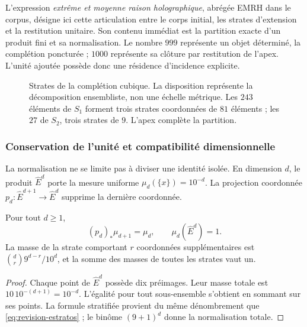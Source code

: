 L'expression \emph{extrême et moyenne raison holographique}, abrégée EMRH dans
le corpus, désigne ici cette articulation entre le corps initial, les
strates d'extension et la restitution unitaire. Son contenu immédiat
est la partition exacte d'un produit fini et sa normalisation. Le nombre
\(999\) représente un objet déterminé, la complétion poncturée ;
\(1000\) représente sa clôture par restitution de l'apex. L'unité
ajoutée possède donc une résidence d'incidence explicite.

\begin{figure}[htbp]
\centering
{}
\caption{Strates de la complétion cubique. La disposition représente
la décomposition ensembliste, non une échelle métrique. Les \(243\) éléments
de \(S_1\) forment trois strates coordonnées de \(81\) éléments ; les \(27\)
de \(S_2\), trois strates de \(9\). L'apex complète la partition.}
\label{fig:revision-emrh}
\end{figure}



\subsubsection{Conservation de l'unité et compatibilité dimensionnelle}

La normalisation ne se limite pas à diviser une identité isolée. En dimension
\(d\), le produit \(\widehat E^d\) porte la mesure uniforme
\(\mu_d(\{x\})=10^{-d}\). La projection coordonnée
\(p_d:\widehat E^{d+1}\to\widehat E^d\) supprime la dernière coordonnée.

\begin{proposition}
Pour tout \(d\geq1\),
\[
 (p_d)_*\mu_{d+1}=\mu_d,
 \qquad \mu_d(\widehat E^d)=1.
\]
La masse de la strate comportant \(r\) coordonnées supplémentaires est
\(\binom dr9^{d-r}/10^d\), et la somme des masses de toutes les strates
vaut un.
\end{proposition}
\begin{proof}
Chaque point de \(\widehat E^d\) possède dix préimages. Leur masse totale est
\(10\,10^{-(d+1)}=10^{-d}\). L'égalité pour tout sous-ensemble
s'obtient en sommant sur ses points. La formule stratifiée provient
du même dénombrement que \eqref{eq:revision-estratos} ; le binôme
\((9+1)^d\) donne la normalisation totale.
\end{proof}


